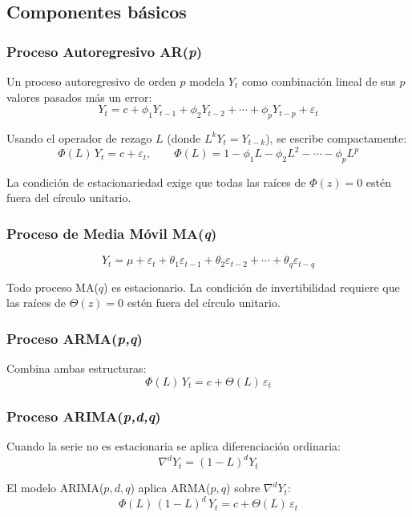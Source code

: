 \documentclass[12pt, a4paper]{article}
\begin{document}
\subsection{Componentes básicos}

\subsubsection{Proceso Autoregresivo AR(\textit{p})}

Un proceso autoregresivo de orden $p$ modela $Y_t$ como combinación lineal de
sus $p$ valores pasados más un error:
\[
  Y_t = c + \phi_1 Y_{t-1} + \phi_2 Y_{t-2} + \cdots + \phi_p Y_{t-p} + \varepsilon_t
\]

Usando el operador de rezago $L$ (donde $L^k Y_t = Y_{t-k}$), se escribe
compactamente:
\[
  \Phi(L)\, Y_t = c + \varepsilon_t, \qquad
  \Phi(L) = 1 - \phi_1 L - \phi_2 L^2 - \cdots - \phi_p L^p
\]

La condición de estacionariedad exige que todas las raíces de $\Phi(z)=0$
estén fuera del círculo unitario.

\subsubsection{Proceso de Media Móvil MA(\textit{q})}

\[
  Y_t = \mu + \varepsilon_t + \theta_1\varepsilon_{t-1}
        + \theta_2\varepsilon_{t-2} + \cdots + \theta_q\varepsilon_{t-q}
\]

Todo proceso MA($q$) es estacionario. La condición de invertibilidad requiere
que las raíces de $\Theta(z)=0$ estén fuera del círculo unitario.

\subsubsection{Proceso ARMA(\textit{p,q})}

Combina ambas estructuras:
\[
  \Phi(L)\, Y_t = c + \Theta(L)\,\varepsilon_t
\]

\subsubsection{Proceso ARIMA(\textit{p,d,q})}

Cuando la serie no es estacionaria se aplica diferenciación ordinaria:
\[
  \nabla^d Y_t = (1-L)^d Y_t
\]

El modelo ARIMA($p,d,q$) aplica ARMA($p,q$) sobre $\nabla^d Y_t$:
\[
  \Phi(L)\,(1-L)^d\,Y_t = c + \Theta(L)\,\varepsilon_t
\]
\end{document}
